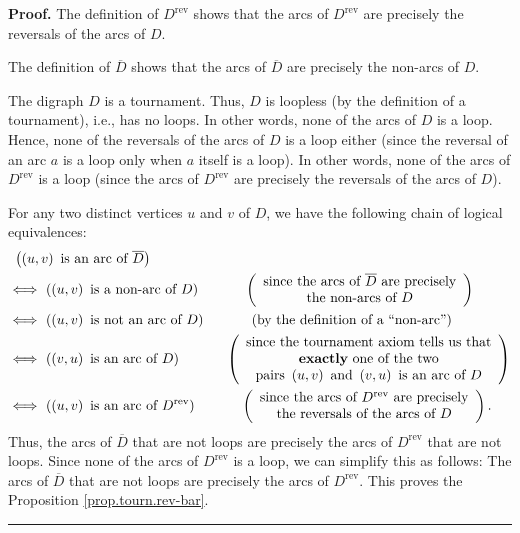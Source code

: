 \documentclass[numbers=enddot,12pt,final,onecolumn,notitlepage]{scrartcl}%
\numberwithin{exer}{subsection}
\theoremstyle{definition}
\newenvironment{proof}[1][Proof]{\noindent\textbf{#1.} }{\ \rule{0.5em}{0.5em}}
\begin{document}
\begin{proof}
The definition of $D^{\operatorname*{rev}}$ shows that the arcs of
$D^{\operatorname*{rev}}$ are precisely the reversals of the arcs of $D$.

The definition of $\overline{D}$ shows that the arcs of $\overline{D}$ are
precisely the non-arcs of $D$.

The digraph $D$ is a tournament. Thus, $D$ is loopless (by the definition of a
tournament), i.e., has no loops. In other words, none of the arcs of $D$ is a
loop. Hence, none of the reversals of the arcs of $D$ is a loop either (since
the reversal of an arc $a$ is a loop only when $a$ itself is a loop). In other
words, none of the arcs of $D^{\operatorname*{rev}}$ is a loop (since the arcs
of $D^{\operatorname*{rev}}$ are precisely the reversals of the arcs of $D$).

For any two distinct vertices $u$ and $v$ of $D$, we have the following chain
of logical equivalences:%
\begin{align*}
&  \ \left(  \left(  u,v\right)  \text{ is an arc of }\overline{D}\right) \\
&  \Longleftrightarrow\ \left(  \left(  u,v\right)  \text{ is a non-arc of
}D\right)  \ \ \ \ \ \ \ \ \ \ \left(
\begin{array}
[c]{c}%
\text{since the arcs of }\overline{D}\text{ are precisely}\\
\text{the non-arcs of }D
\end{array}
\right) \\
&  \Longleftrightarrow\ \left(  \left(  u,v\right)  \text{ is not an arc of
}D\right)  \ \ \ \ \ \ \ \ \ \ \left(  \text{by the definition of a
\textquotedblleft non-arc\textquotedblright}\right) \\
&  \Longleftrightarrow\ \left(  \left(  v,u\right)  \text{ is an arc of
}D\right)  \ \ \ \ \ \ \ \ \ \ \left(
\begin{array}
[c]{c}%
\text{since the tournament axiom tells us that}\\
\text{\textbf{exactly} one of the two}\\
\text{pairs }\left(  u,v\right)  \text{ and }\left(  v,u\right)  \text{ is an
arc of }D
\end{array}
\right) \\
&  \Longleftrightarrow\ \left(  \left(  u,v\right)  \text{ is an arc of
}D^{\operatorname*{rev}}\right)  \ \ \ \ \ \ \ \ \ \ \left(
\begin{array}
[c]{c}%
\text{since the arcs of }D^{\operatorname*{rev}}\text{ are precisely}\\
\text{the reversals of the arcs of }D
\end{array}
\right)  .
\end{align*}
Thus, the arcs of $\overline{D}$ that are not loops are precisely the arcs of
$D^{\operatorname*{rev}}$ that are not loops. Since none of the arcs of
$D^{\operatorname*{rev}}$ is a loop, we can simplify this as follows: The arcs
of $\overline{D}$ that are not loops are precisely the arcs of
$D^{\operatorname*{rev}}$. This proves the Proposition
\ref{prop.tourn.rev-bar}.
\end{proof}
\end{document}

